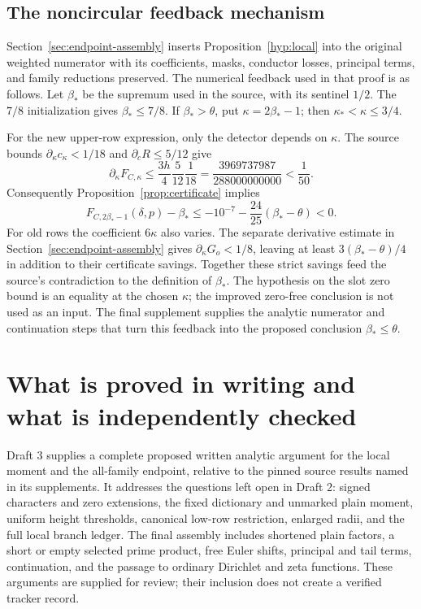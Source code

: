 \documentclass[11pt]{article}
\theoremstyle{definition}
\begin{document}
\subsection{The noncircular feedback mechanism}
Section~\ref{sec:endpoint-assembly} inserts Proposition~\ref{hyp:local}
into the original weighted numerator with its coefficients, masks,
conductor losses, principal terms, and family reductions preserved.
The numerical feedback used in that proof is as follows. Let $\beta_*$ be the supremum used in the source, with its sentinel
$1/2$. The $7/8$ initialization gives $\beta_*\le7/8$. If
$\beta_*>\theta$, put $\kappa=2\beta_*-1$; then
$\kappa_*<\kappa\le3/4$.

For the new upper-row expression, only the detector depends on $\kappa$.
The source bounds $\partial_\kappa c_\kappa<1/18$ and
$\partial_cR\le5/12$ give
\[
 \partial_\kappa F_{C,\kappa}
 \le\frac{3h}{4}\frac5{12}\frac1{18}
 =\frac{3969737987}{288000000000}<\frac1{50}.
\]
Consequently Proposition~\ref{prop:certificate} implies
\begin{equation}\label{eq:feedback}
 F_{C,2\beta_*-1}(\delta,p)-\beta_*
 \le-10^{-7}-\frac{24}{25}(\beta_*-\theta)<0.
\end{equation}
For old rows the coefficient $6\kappa$ also varies. The separate
derivative estimate in Section~\ref{sec:endpoint-assembly} gives
$\partial_\kappa G_o<1/8$, leaving at least
$3(\beta_*-\theta)/4$ in addition to their certificate savings.
Together these strict savings feed the source's contradiction to the
definition of $\beta_*$. The hypothesis on the slot zero bound is an
equality at the chosen $\kappa$; the improved zero-free conclusion is
not used as an input. The final supplement supplies the analytic
numerator and continuation steps that turn this feedback into the
proposed conclusion $\beta_*\le\theta$.

\section{What is proved in writing and what is independently checked}\label{sec:gaps}

Draft 3 supplies a complete proposed written analytic argument for the
local moment and the all-family endpoint, relative to the pinned source
results named in its supplements. It addresses the questions left open
in Draft 2: signed characters and zero extensions, the fixed dictionary
and unmarked plain moment, uniform height thresholds, canonical low-row
restriction, enlarged radii, and the full local branch ledger. The final
assembly includes shortened plain factors, a short or empty selected
prime product, free Euler shifts, principal and tail terms, continuation,
and the passage to ordinary Dirichlet and zeta functions. These arguments
are supplied for review; their inclusion does not create a verified
tracker record.
\end{document}
